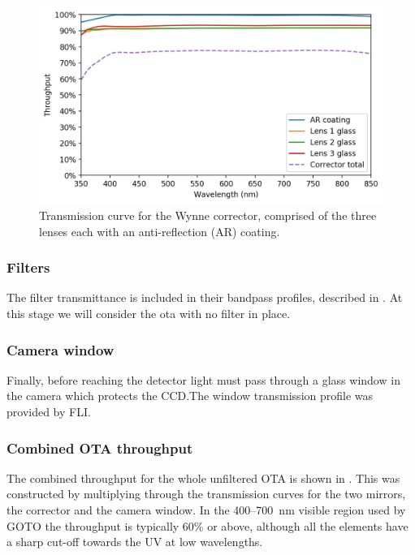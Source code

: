 \begin{colsection}
\begin{colsection}
\begin{figure}[t]
    \begin{center}
        \includegraphics[width=\textwidth]{images/throughput/trans_lenses.png}
    \end{center}
    \caption[Wynne corrector transmission curve]{
        Transmission curve for the Wynne corrector, comprised of the three lenses each with an anti-reflection (AR) coating.
    }\label{fig:trans_lenses}
\end{figure}

\subsubsection{Filters}

The filter transmittance is included in their bandpass profiles, described in . At this stage we will consider the \gls{ota} with no filter in place.

\subsubsection{Camera window}

Finally, before reaching the detector light must pass through a glass window in the camera which protects the CCD.\@ The window transmission profile was provided by FLI.\@

\newpage

\subsubsection{Combined OTA throughput}

The combined throughput for the whole unfiltered OTA is shown in . This was constructed by multiplying through the transmission curves for the two mirrors, the corrector and the camera window. In the 400--\SI{700}{\nano\metre} visible region used by GOTO the throughput is typically 60\% or above, although all the elements have a sharp cut-off towards the UV at low wavelengths.


\end{colsection}
\end{colsection}
